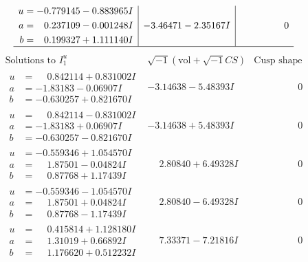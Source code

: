 \documentclass[1p]{elsarticle_modified}
\theoremstyle{definition}
\newcommand{\I}{\sqrt{-1}}
\begin{document}
$$\begin{array}{c|c|c}
\begin{aligned}
u &= -0.779145 - 0.883965 I \\
a &= \phantom{-}0.237109 - 0.001248 I \\
b &= \phantom{-}0.199327 + 1.111140 I\end{aligned}
 & -3.46471 - 2.35167 I & \phantom{-0.000000 } 0\\
 \hline 
 \end{array}$$\newpage$$\begin{array}{c|c|c}  
\text{Solutions to }I^u_{1}& \I (\text{vol} + \sqrt{-1}CS) & \text{Cusp shape}\\
 \hline 
\begin{aligned}
u &= \phantom{-}0.842114 + 0.831002 I \\
a &= -1.83183 - 0.06907 I \\
b &= -0.630257 + 0.821670 I\end{aligned}
 & -3.14638 - 5.48393 I & \phantom{-0.000000 } 0 \\ \hline\begin{aligned}
u &= \phantom{-}0.842114 - 0.831002 I \\
a &= -1.83183 + 0.06907 I \\
b &= -0.630257 - 0.821670 I\end{aligned}
 & -3.14638 + 5.48393 I & \phantom{-0.000000 } 0 \\ \hline\begin{aligned}
u &= -0.559346 + 1.054570 I \\
a &= \phantom{-}1.87501 - 0.04824 I \\
b &= \phantom{-}0.87768 + 1.17439 I\end{aligned}
 & \phantom{-}2.80840 + 6.49328 I & \phantom{-0.000000 } 0 \\ \hline\begin{aligned}
u &= -0.559346 - 1.054570 I \\
a &= \phantom{-}1.87501 + 0.04824 I \\
b &= \phantom{-}0.87768 - 1.17439 I\end{aligned}
 & \phantom{-}2.80840 - 6.49328 I & \phantom{-0.000000 } 0 \\ \hline\begin{aligned}
u &= \phantom{-}0.415814 + 1.128180 I \\
a &= \phantom{-}1.31019 + 0.66892 I \\
b &= \phantom{-}1.176620 + 0.512232 I\end{aligned}
 & \phantom{-}7.33371 - 7.21816 I & \phantom{-0.000000 } 0 \\ \hline\begin{aligned}

\end{aligned}
\end{array}$$
\end{document}
